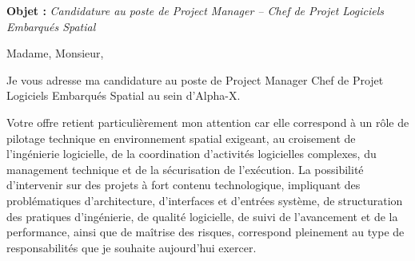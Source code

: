 \documentclass[11pt,a4paper]{../_shared/altacv}
\begin{document}
\makecvheader
\vspace{-0.5cm}
\vspace{-0.3cm}

{\color{accent}\textbf{Objet :}} \textit{Candidature au poste de Project Manager -- Chef de Projet Logiciels Embarqués Spatial}

{\color{body}

Madame, Monsieur,

Je vous adresse ma candidature au poste de Project Manager Chef de Projet Logiciels Embarqués Spatial au sein d'Alpha-X.

Votre offre retient particulièrement mon attention car elle correspond à un rôle de pilotage technique en environnement spatial exigeant, au croisement de l'ingénierie logicielle, de la coordination d'activités logicielles complexes, du management technique et de la sécurisation de l'exécution. La possibilité d'intervenir sur des projets à fort contenu technologique, impliquant des problématiques d'architecture, d'interfaces et d'entrées système, de structuration des pratiques d'ingénierie, de qualité logicielle, de suivi de l'avancement et de la performance, ainsi que de maîtrise des risques, correspond pleinement au type de responsabilités que je souhaite aujourd'hui exercer.

}
\end{document}
